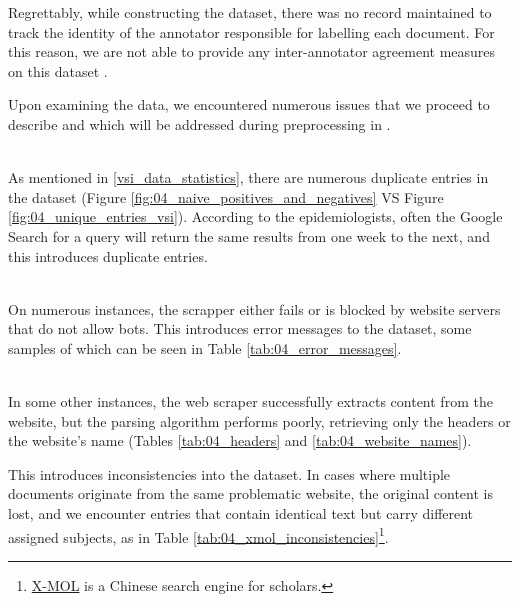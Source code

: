 Regrettably, while constructing the dataset, there was no record maintained to track the identity of the annotator responsible for labelling each document. For this reason, we are not able to provide any inter-annotator agreement measures on this dataset .


\label{vsi_data_issues}


Upon examining the data, we encountered numerous issues that we proceed to describe and which will be addressed during preprocessing in \headerName{} .


\label{vsi_issues_duplicates}
\ \\

As mentioned in \headerName{} \ref{vsi_data_statistics}, there are numerous duplicate entries in the dataset (Figure \ref{fig:04_naive_positives_and_negatives} VS Figure \ref{fig:04_unique_entries_vsi}). According to the epidemiologists, often the Google Search for a query will return the same results from one week to the next, and this introduces duplicate entries.
 


\label{vsi_issues_error_messages}
\ \\

On numerous instances, the \trafilatura{} scrapper either fails or is blocked by website servers that do not allow bots. This introduces error messages to the dataset, some samples of which can be seen in Table \ref{tab:04_error_messages}.





\label{vsi_issues_scrapping_errors}
\ \\

In some other instances, the web scraper successfully extracts content from the website, but the parsing algorithm performs poorly, retrieving only the headers or the website's name (Tables \ref{tab:04_headers} and \ref{tab:04_website_names}).




This introduces inconsistencies into the \VSI{} dataset. In cases where multiple documents originate from the same problematic website, the original content is lost, and we encounter entries that contain identical text but carry different assigned subjects, as in Table \ref{tab:04_xmol_inconsistencies}\footnote{\href{https://www.x-mol.com/}{X-MOL} is a Chinese search engine for scholars.}.




